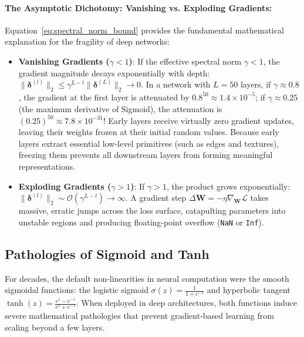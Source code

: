 \paragraph{The Asymptotic Dichotomy: Vanishing vs. Exploding Gradients:}
Equation~\eqref{eq:spectral_norm_bound} provides the fundamental mathematical explanation for the fragility of deep networks:
\begin{itemize}[leftmargin=*]
  \item \textbf{Vanishing Gradients ($\gamma < 1$)}: If the effective spectral norm $\gamma < 1$, the gradient magnitude decays exponentially with depth: $\|\boldsymbol{\delta}^{(l)}\|_2 \le \gamma^{L-l} \|\boldsymbol{\delta}^{(L)}\|_2 \to 0$. In a network with $L = 50$ layers, if $\gamma \approx 0.8$, the gradient at the first layer is attenuated by $0.8^{50} \approx 1.4 \times 10^{-5}$; if $\gamma \approx 0.25$ (the maximum derivative of Sigmoid), the attenuation is $(0.25)^{50} \approx 7.8 \times 10^{-31}$! Early layers receive virtually zero gradient updates, leaving their weights frozen at their initial random values. Because early layers extract essential low-level primitives (such as edges and textures), freezing them prevents all downstream layers from forming meaningful representations.
  \item \textbf{Exploding Gradients ($\gamma > 1$)}: If $\gamma > 1$, the product grows exponentially: $\|\boldsymbol{\delta}^{(l)}\|_2 \sim \mathcal{O}(\gamma^{L-l}) \to \infty$. A gradient step $\Delta \mathbf{W} = -\eta \nabla_{\mathbf{W}} \mathcal{L}$ takes massive, erratic jumps across the loss surface, catapulting parameters into unstable regions and producing floating-point overflow (\texttt{NaN} or \texttt{Inf}).
\end{itemize}

\subsection{Pathologies of Sigmoid and Tanh}
\label{sec:sigmoid_tanh_pathologies}

For decades, the default non-linearities in neural computation were the smooth sigmoidal functions: the logistic sigmoid $\sigma(z) = \frac{1}{1 + e^{-z}}$ and hyperbolic tangent $\tanh(z) = \frac{e^z - e^{-z}}{e^z + e^{-z}}$. When deployed in deep architectures, both functions induce severe mathematical pathologies that prevent gradient-based learning from scaling beyond a few layers.

